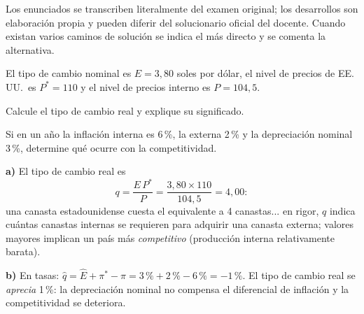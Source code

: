 \documentclass[soluciones]{evaluacion}
\begin{document}

\begin{observacion}
Los enunciados se transcriben literalmente del examen original; los
desarrollos son elaboración propia y pueden diferir del solucionario
oficial del docente. Cuando existan varios caminos de solución se indica
el más directo y se comenta la alternativa.
\end{observacion}


\begin{pregunta}
El tipo de cambio nominal es $E = 3{,}80$ soles por dólar, el nivel de
precios de EE.\,UU.\ es $P^{*} = 110$ y el nivel de precios interno es
$P = 104{,}5$.
\begin{apartados}
  \item Calcule el tipo de cambio real y explique su significado. 
  \item Si en un año la inflación interna es 6\,\%, la externa 2\,\% y la
        depreciación nominal 3\,\%, determine qué ocurre con la
        competitividad. 
\end{apartados}
\begin{solucion}
\textbf{a)} El tipo de cambio real es
\[
  q = \frac{E\,P^{*}}{P} = \frac{3{,}80 \times 110}{104{,}5} = 4{,}00:
\]
una canasta estadounidense cuesta el equivalente a 4 canastas... en
rigor, $q$ indica cuántas canastas internas se requieren para adquirir
una canasta externa; valores mayores implican un país más
\emph{competitivo} (producción interna relativamente barata).

\textbf{b)} En tasas: $\hat q = \hat E + \pi^{*} - \pi
= 3\,\% + 2\,\% - 6\,\% = -1\,\%$. El tipo de cambio real se
\emph{aprecia} 1\,\%: la depreciación nominal no compensa el diferencial
de inflación y la competitividad se deteriora.
\end{solucion}
\end{pregunta}
\end{document}
